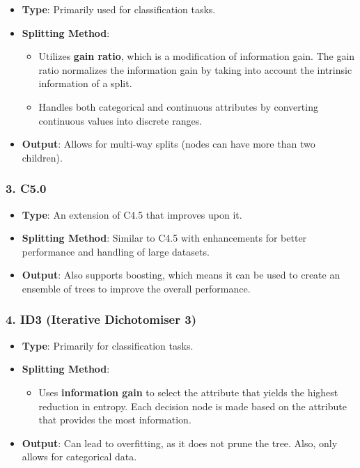 \documentclass[12pt]{book}
\providecommand{\tightlist}{%
  \setlength{\itemsep}{0pt}\setlength{\parskip}{0pt}}
\begin{document}
\begin{itemize}
\tightlist
\item
  \textbf{Type}: Primarily used for classification tasks.
\item
  \textbf{Splitting Method}:

  \begin{itemize}
  \tightlist
  \item
    Utilizes \textbf{gain ratio}, which is a modification of information
    gain. The gain ratio normalizes the information gain by taking into
    account the intrinsic information of a split.
  \item
    Handles both categorical and continuous attributes by converting
    continuous values into discrete ranges.
  \end{itemize}
\item
  \textbf{Output}: Allows for multi-way splits (nodes can have more than
  two children).
\end{itemize}

\subsubsection{3. C5.0}\label{c5.0}

\begin{itemize}
\tightlist
\item
  \textbf{Type}: An extension of C4.5 that improves upon it.
\item
  \textbf{Splitting Method}: Similar to C4.5 with enhancements for
  better performance and handling of large datasets.
\item
  \textbf{Output}: Also supports boosting, which means it can be used to
  create an ensemble of trees to improve the overall performance.
\end{itemize}

\subsubsection{4. ID3 (Iterative Dichotomiser
3)}\label{id3-iterative-dichotomiser-3}

\begin{itemize}
\tightlist
\item
  \textbf{Type}: Primarily for classification tasks.
\item
  \textbf{Splitting Method}:

  \begin{itemize}
  \tightlist
  \item
    Uses \textbf{information gain} to select the attribute that yields
    the highest reduction in entropy. Each decision node is made based
    on the attribute that provides the most information.
  \end{itemize}
\item
  \textbf{Output}: Can lead to overfitting, as it does not prune the
  tree. Also, only allows for categorical data.
\end{itemize}
\end{document}
